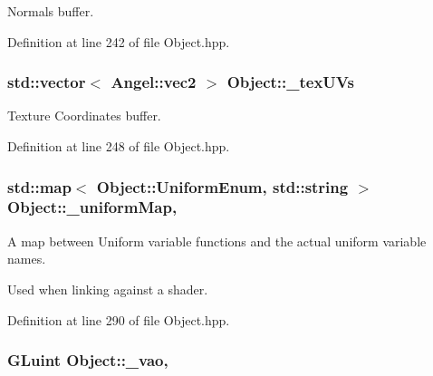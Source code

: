 Normals buffer. 



Definition at line 242 of file Object.\-hpp.

\hypertarget{class_object_aa9ddc3b95d74b76ab8a251fb376dfafb}{
\subsubsection[{\-\_\-tex\-U\-Vs}]{\setlength{\rightskip}{0pt plus 5cm}std\-::vector$<$ {\bf Angel\-::vec2} $>$ Object\-::\-\_\-tex\-U\-Vs\hspace{0.3cm}{\ttfamily [inherited]}}}\label{class_object_aa9ddc3b95d74b76ab8a251fb376dfafb}


Texture Coordinates buffer. 



Definition at line 248 of file Object.\-hpp.

\hypertarget{class_object_a6378d0b0eeec23045ae2a5245e42bf13}{
\subsubsection[{\-\_\-uniform\-Map}]{\setlength{\rightskip}{0pt plus 5cm}std\-::map$<$ {\bf Object\-::\-Uniform\-Enum}, std\-::string $>$ Object\-::\-\_\-uniform\-Map\hspace{0.3cm}{\ttfamily [protected]}, {\ttfamily [inherited]}}}\label{class_object_a6378d0b0eeec23045ae2a5245e42bf13}


A map between Uniform variable functions and the actual uniform variable names. 

Used when linking against a shader. 

Definition at line 290 of file Object.\-hpp.

\hypertarget{class_object_a564aa6b1df66a05ab6b6c2f071851c4e}{
\subsubsection[{\-\_\-vao}]{\setlength{\rightskip}{0pt plus 5cm}G\-Luint Object\-::\-\_\-vao\hspace{0.3cm}{\ttfamily [protected]}, {\ttfamily [inherited]}}}\label{class_object_a564aa6b1df66a05ab6b6c2f071851c4e}


